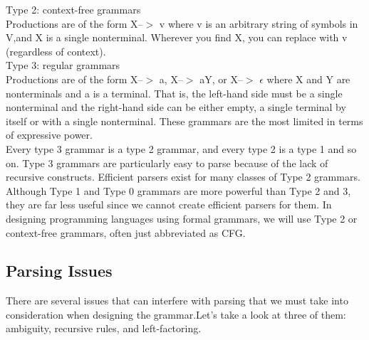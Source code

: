 Type 2: context-free grammars\\
Productions are of the form X–$>$ v where v is an arbitrary string of symbols in V,and X is a single nonterminal. Wherever you find X, you can replace with v (regardless of context).\\

Type 3: regular grammars\\
Productions are of the form X–$>$ a, X–$>$ aY, or X–$>$ $\epsilon$  where X and Y are nonterminals and a is a terminal. That is, the left-hand side must be a single nonterminal and the right-hand side can be either empty, a single terminal by itself or with a single nonterminal. These grammars are the most limited in terms of expressive power.\\

Every type 3 grammar is a type 2 grammar, and every type 2 is a type 1 and so on. Type 3 grammars are particularly easy to parse because of the lack of recursive constructs.
Efficient parsers exist for many classes of Type 2 grammars. Although Type 1 and Type 0
grammars are more powerful than Type 2 and 3, they are far less useful since we cannot
create efficient parsers for them. In designing programming languages using formal
grammars, we will use Type 2 or context-free grammars, often just abbreviated as CFG.



\subsection{Parsing Issues}


There are several issues that can interfere with parsing that we must take into consideration when designing the grammar.Let’s take a look at three of them: ambiguity, recursive rules, and left-factoring.

